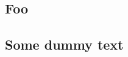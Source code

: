 \documentclass{report}
\begin{document}
\begin{titlepage}

\thispagestyle{empty}
\chapter*{Foo}
\lipsum[1]

\end{titlepage}

\section*{Some dummy text}
\marginpar{\lipsum[5]}
\lipsum[2-15]
\end{document}
